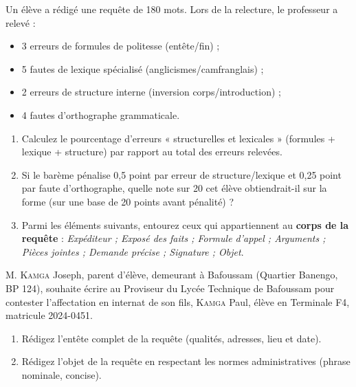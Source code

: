 \documentclass[11pt]{article}
\newcounter{popsec}
\newcounter{popsub}
\newcommand{\courssub}[1]{%
  \stepcounter{popsub}%
  \par\vspace{9pt}\noindent{\popxbold\fontsize{11.5}{13}\selectfont\color{popink}{\color{poporange}\thepopsec.\thepopsub}\hspace{6pt}#1}\par\nopagebreak\vspace{4pt}
}
\begin{document}
\begin{exercice}
Un élève a rédigé une requête de 180 mots. Lors de la relecture, le professeur a relevé :
\begin{itemize}
    \item 3 erreurs de formules de politesse (entête/fin) ;
    \item 5 fautes de lexique spécialisé (anglicismes/camfranglais) ;
    \item 2 erreurs de structure interne (inversion corps/introduction) ;
    \item 4 fautes d'orthographe grammaticale.
\end{itemize}
\begin{enumerate}
    \item Calculez le pourcentage d'erreurs « structurelles et lexicales » (formules + lexique + structure) par rapport au total des erreurs relevées.
    \item Si le barème pénalise 0,5 point par erreur de structure/lexique et 0,25 point par faute d'orthographe, quelle note sur 20 cet élève obtiendrait-il sur la forme (sur une base de 20 points avant pénalité) ?
    \item Parmi les éléments suivants, entourez ceux qui appartiennent au \textbf{corps de la requête} : \textit{Expéditeur ; Exposé des faits ; Formule d'appel ; Arguments ; Pièces jointes ; Demande précise ; Signature ; Objet}.
\end{enumerate}
\end{exercice}

\courssub{Je m'entraîne}

\begin{exercice}
M. \textsc{Kamga} Joseph, parent d'élève, demeurant à Bafoussam (Quartier Banengo, BP 124), souhaite écrire au Proviseur du Lycée Technique de Bafoussam pour contester l'affectation en internat de son fils, \textsc{Kamga} Paul, élève en Terminale F4, matricule 2024-0451.
\begin{enumerate}
    \item Rédigez l'entête complet de la requête (qualités, adresses, lieu et date).
    \item Rédigez l'objet de la requête en respectant les normes administratives (phrase nominale, concise).
\end{enumerate}
\end{exercice}
\end{document}
